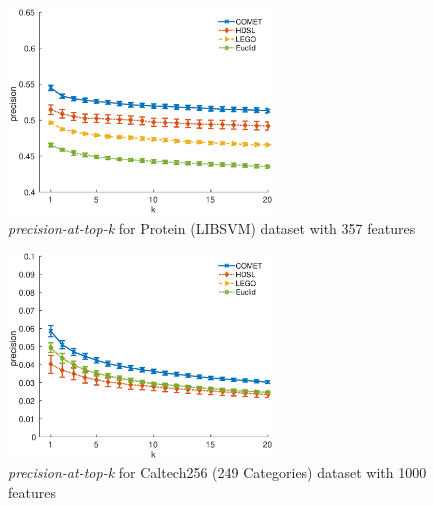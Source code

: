 \documentclass[twoside,11pt]{article}
\begin{document}
\begin{figure}[h]
\centering
\includegraphics[width=7cm]{precision@k_protein}
\captionsetup{font=small}
\caption*{\textit{precision-at-top-k} for Protein (LIBSVM) dataset with 357 features}
\end{figure}

\begin{figure}[h]
\centering
\includegraphics[width=7cm]{precision@k_Caltech256_with_249Categories}
\captionsetup{font=small}
\caption*{\textit{precision-at-top-k} for Caltech256 (249 Categories) dataset with 1000 features}
\end{figure}

\vskip 0.2in
\clearpage 

\end{document}
